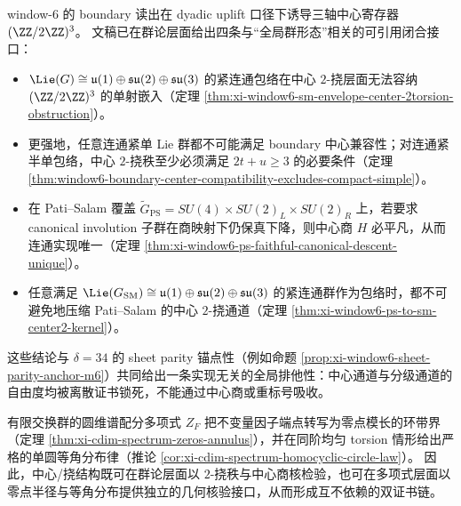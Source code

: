 \begin{remark}\label{rem:window6-center-ps-chain-existing}
window-\(6\) 的 boundary 读出在 dyadic uplift 口径下诱导三轴中心寄存器 \((\ZZ/2\ZZ)^3\)。
文稿已在群论层面给出四条与“全局群形态”相关的可引用闭合接口：
\begin{itemize}
  \item \(\Lie(G)\cong \mathfrak u(1)\oplus\mathfrak{su}(2)\oplus\mathfrak{su}(3)\) 的紧连通包络在中心 \(2\)-挠层面无法容纳 \((\ZZ/2\ZZ)^3\) 的单射嵌入（定理 \ref{thm:xi-window6-sm-envelope-center-2torsion-obstruction}）。
  \item 更强地，任意连通紧单 Lie 群都不可能满足 boundary 中心兼容性；对连通紧半单包络，中心 \(2\)-挠秩至少必须满足 \(2t+u\ge 3\) 的必要条件（定理 \ref{thm:window6-boundary-center-compatibility-excludes-compact-simple}）。
  \item 在 Pati--Salam 覆盖 \(\widetilde G_{\mathrm{PS}}=SU(4)\times SU(2)_L\times SU(2)_R\) 上，若要求 canonical involution 子群在商映射下仍保真下降，则中心商 \(H\) 必平凡，从而连通实现唯一（定理 \ref{thm:xi-window6-ps-faithful-canonical-descent-unique}）。
  \item 任意满足 \(\Lie(G_{\mathrm{SM}})\cong \mathfrak u(1)\oplus\mathfrak{su}(2)\oplus\mathfrak{su}(3)\) 的紧连通群作为包络时，都不可避免地压缩 Pati--Salam 的中心 \(2\)-挠通道（定理 \ref{thm:xi-window6-ps-to-sm-center2-kernel}）。
\end{itemize}
这些结论与 \(\delta=34\) 的 sheet parity 锚点性（例如命题 \ref{prop:xi-window6-sheet-parity-anchor-m6}）共同给出一条实现无关的全局排他性：中心通道与分级通道的自由度均被离散证书锁死，不能通过中心商或重标号吸收。
\end{remark}

\begin{remark}\label{rem:window6-torsion-zeros-geometry}
有限交换群的圆维谱配分多项式 \(Z_F\) 把不变量因子端点转写为零点模长的环带界（定理 \ref{thm:xi-cdim-spectrum-zeros-annulus}），并在同阶均匀 torsion 情形给出严格的单圆等角分布律（推论 \ref{cor:xi-cdim-spectrum-homocyclic-circle-law}）。
因此，中心/挠结构既可在群论层面以 \(2\)-挠秩与中心商核检验，也可在多项式层面以零点半径与等角分布提供独立的几何核验接口，从而形成互不依赖的双证书链。
\end{remark}

